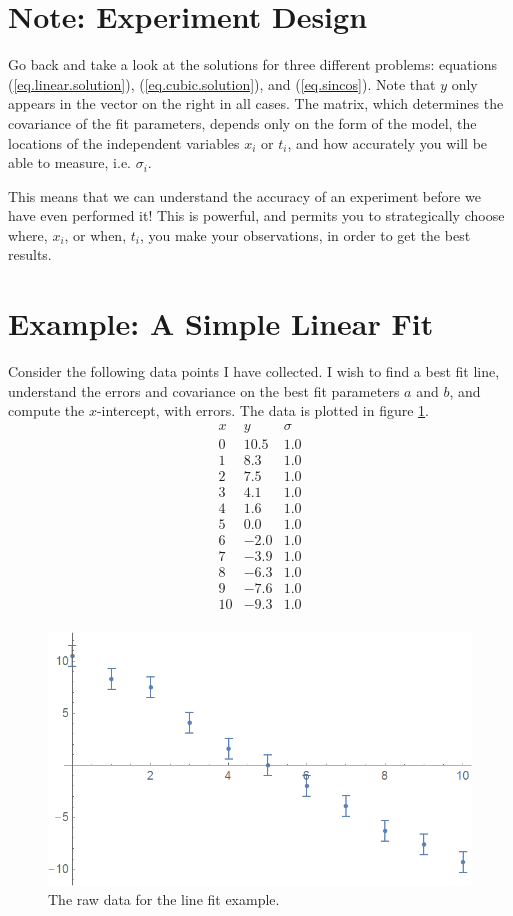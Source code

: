 \documentclass[letterpaper,12pt]{article}
\begin{document}
\section{Note: Experiment Design}

Go back and take a look at the solutions for three different problems: equations (\ref{eq.linear.solution}), (\ref{eq.cubic.solution}), and (\ref{eq.sincos}). Note that $y$ only appears in the vector on the right in all cases. The matrix, which determines the covariance of the fit parameters, depends only on the form of the model, the locations of the independent variables $x_i$ or $t_i$, and how accurately you will be able to measure, i.e. $\sigma_i$.

This means that we can understand the accuracy of an experiment before we have even performed it! This is powerful, and permits you to strategically choose where, $x_i$, or when, $t_i$, you make your observations, in order to get the best results.

\section{Example: A Simple Linear Fit}

Consider the following data points I have collected. I wish to find a best fit line, understand the errors and covariance on the best fit parameters $a$ and $b$, and compute the $x$-intercept, with errors. The data is plotted in figure \ref{fig.linear.data}.
\begin{equation*}
\begin{array}{rrr}
	x & y\  & \sigma \\
	0 & 10.5 & 1.0 \\
	1 & 8.3 & 1.0 \\
	2 & 7.5 & 1.0 \\
	3 & 4.1 & 1.0 \\
	4 & 1.6 & 1.0 \\
	5 & 0.0 & 1.0 \\
	6 & -2.0 & 1.0 \\
	7 & -3.9 & 1.0 \\
	8 & -6.3 & 1.0 \\
	9 & -7.6 & 1.0 \\
	10 & -9.3 & 1.0 \\
\end{array}
\end{equation*}

\begin{figure}[ht] 
	\centering	\includegraphics[width=0.7\columnwidth]{line.fit.example}
	\caption{
		\label{fig.linear.data}
		The raw data for the line fit example.
	}
\end{figure}
\end{document}

